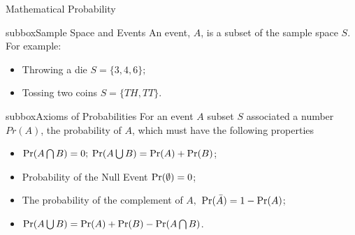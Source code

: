 \documentclass[10pt,a4paper]{article}
\def\Pr{\mathop{\rm Pr}}
\begin{document}
\begin{multicols}{3}
\begin{textbox}{Mathematical Probability }
\begin{subbox}{subbox}{Sample Space and Events}
An event, $A$, is a subset of the sample space $S$. For example:
\begin{itemize}
    \item Throwing a die $S=\{3,4,6\};$
    \item Tossing two coins $S=\{TH,TT\}.$
\end{itemize}
\end{subbox}

\begin{subbox}{subbox}{Axioms of Probabilities}
\tiny
For an event $A$ subset $S$ associated a number $Pr(A)$, the probability of $A$, which must have the following properties

\begin{itemize}
     \item $\Pr(A \bigcap B)=0;$ $\Pr(A\bigcup B)= \Pr(A)+\Pr(B) $;
     \item Probability of the Null Event $\Pr(\emptyset)=0$;
     \item The probability of the complement of $A,$ $\Pr(\bar{A})=1-\Pr(A)$;
     \item $\Pr(A \bigcup B)= \Pr(A)+\Pr(B)-\Pr(A\bigcap B)$.
\end{itemize}
\end{subbox}


\end{textbox}



\end{multicols}
\end{document}

